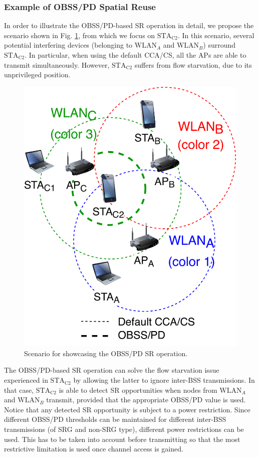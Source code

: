 \documentclass[comsoc]{IEEEtran}
\begin{document}
	\subsubsection{Example of OBSS/PD Spatial Reuse}
	In order to illustrate the OBSS/PD-based SR operation in detail, we propose the scenario shown in Fig. \ref{fig:fig_8_a}, from which we focus on $\text{STA}_\text{C2}$. In this scenario, several potential interfering devices (belonging to $\text{WLAN}_A$ and $\text{WLAN}_B$) surround $\text{STA}_\text{C2}$. In particular, when using the default CCA/CS, all the APs are able to transmit simultaneously. However, $\text{STA}_\text{C2}$ suffers from flow starvation, due to its unprivileged position.
	\begin{figure}[ht!]
		\centering
		\includegraphics[width=0.6\columnwidth]{fig_11}
		\caption{Scenario for showcasing the OBSS/PD SR operation.}
		\label{fig:fig_8_a}
	\end{figure}
	
	The OBSS/PD-based SR operation can solve the flow starvation issue experienced in $\text{STA}_\text{C2}$ by allowing the latter to ignore inter-BSS transmissions. In that case, $\text{STA}_\text{C2}$ is able to detect SR opportunities when nodes from $\text{WLAN}_A$ and $\text{WLAN}_B$ transmit, provided that the appropriate OBSS/PD value is used. Notice that any detected SR opportunity is subject to a power restriction. Since different OBSS/PD thresholds can be maintained for different inter-BSS transmissions (of SRG and non-SRG type), different power restrictions can be used. This has to be taken into account before transmitting so that the most restrictive limitation is used once channel access is gained.
	
\end{document}
